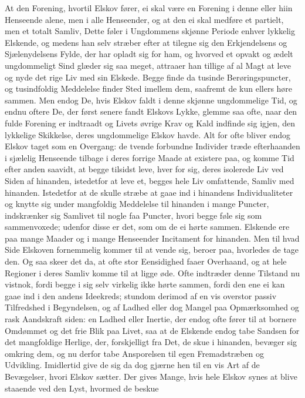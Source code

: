 \documentclass[12pt,a4paper]{book}
\newcommand{\apage}[1]{\marginnote{\footnotesize\textit{[#1]}}}
\begin{document}
At den Forening, hvortil Elskov fører, ei skal være en Forening i denne
eller hiin Henseende alene, men i alle Henseender, og at den ei skal
medføre et partielt, men et totalt Samliv, Dette føler i Ungdommens
skjønne Periode enhver lykkelig Elskende, og medens han selv stræber
efter at tilegne sig den Erkjendelsens og Sjælenydelsens Fylde, der har
opladt sig for ham, og hvorved et opvakt og ædelt ungdommeligt Sind
glæder sig saa meget, attraaer han tillige af al Magt at leve og nyde
det rige Liv med sin Elskede. Begge finde da tusinde Berøringspuncter,
og tusindfoldig Meddelelse finder Sted imellem dem, saafremt de kun
ellers høre sammen. Men endog De, hvis Elskov faldt i denne skjønne
ungdommelige Tid, og endnu oftere De, der først senere fandt Elskovs
Lykke, glemme saa ofte, naar den fulde Forening er indtraadt og Livets
øvrige Krav og Kald indfinde sig igjen, den lykkelige Skikkelse, deres
ungdommelige Elskov havde. Alt for ofte bliver endog Elskov taget som en
Overgang: de tvende forbundne Individer træde efterhaanden i sjælelig
Henseende tilbage i deres forrige Maade at existere paa, og komme Tid
efter anden saavidt, at begge tilsidst leve, hver for sig, deres
isolerede Liv ved Siden af hinanden, \apage{99} istedetfor at leve et, begges hele
Liv omfattende, Samliv med hinanden. Istedetfor at de skulle stræbe at
gaae ind i hinandens Individualiteter og knytte sig under mangfoldig
Meddelelse til hinanden i mange Puncter, indskrænker sig Samlivet til
nogle faa Puncter, hvori begge føle sig som sammenvoxede; udenfor disse
er det, som om de ei hørte sammen. Elskende ere paa mange Maader og i
mange Henseender Incitament for hinanden. Men til hvad Side Elskoven
fornemmelig kommer til at vende sig, beroer paa, hvorledes de tage den.
Og saa skeer det da, at ofte stor Eensidighed faaer Overhaand, og at
hele Regioner i deres Samliv komme til at ligge øde. Ofte indtræder
denne Tilstand nu vistnok, fordi begge i sig selv virkelig ikke hørte
sammen, fordi den ene ei kan gaae ind i den andens Ideekreds; stundom
derimod af en vis overstor passiv Tilfredshed i Begyndelsen, og af
Ladhed eller dog Mangel paa Opmærksomhed og rask Aandskraft siden: en
Ladhed eller Inertie, der endog ofte fører til at bornere Omdømmet og
det frie Blik paa Livet, saa at de Elskende endog tabe Sandsen for det
mangfoldige Herlige, der, forskjelligt fra Det, de skue i hinanden,
bevæger sig omkring dem, og nu derfor tabe Ansporelsen til egen
Fremadstræben og Udvikling. Imidlertid give de sig da dog gjærne hen til
en vis Art af de Bevægelser, hvori Elskov sætter. Der gives Mange, hvis
hele Elskov synes at blive staaende ved den Lyst, hvormed de beskue
\end{document}
